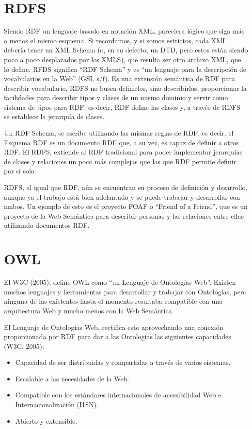 \section{RDFS}

Siendo RDF un lenguaje basado en notación XML, pareciera lógico que siga más o menos el mismo esquema. Si recordamos, y si somos estrictos, cada XML debería tener un XML Schema (o, en su defecto, un DTD, pero estos están siendo poco a poco desplazados por los XMLS), que resulta ser otro archivo XML, que lo define. RFDS significa ``RDF Schema'' y es ``un lenguaje para la descripción de vocabularios en la Web'' (GSI, s/f). Es una extensión semántica de RDF para describir vocabulario, RDFS no busca definirlos, sino describirlos, proporcionar la facilidades para describir tipos y clases de un mismo dominio y servir como sistema de tipos para RDF, es decir, RDF define las clases y, a través de RDFS se establece la jerarquía de clases.

Un RDF Schema, se escribe utilizando las mismas reglas de RDF, es decir, el Esquema RDF es un documento RDF que, a su vez, es capaz de definir a otros RDF. El RDFS, extiende al RDF tradicional para poder implementar jerarquías de clases y relaciones un poco más complejas que las que RDF permite definir por sí solo.

RDFS, al igual que RDF, aún se encuentran en proceso de definición y desarrollo, aunque ya el trabajo está bien adelantado y se puede trabajar y desarrollar con ambos. Un ejemplo de esto es el proyecto FOAF o ``Friend of a Friend'', que es un proyecto de la Web Semántica para describir personas y las relaciones entre ellas utilizando documentos RDF.

\section{OWL}

El W3C (2005), define OWL como ``un Lenguaje de Ontologías Web''. Existen muchos lenguajes y herramientas para desarrollar y trabajar con Ontologías, pero ninguna de las existentes hasta el momento resultaba compatible con una arquitectura Web y mucho menos con la Web Semántica. 

El Lenguaje de Ontologías Web, rectifica esto aprovechando una conexión proporcionada por RDF para dar a las Ontologías las siguientes capacidades (W3C, 2005):

\begin{itemize}
\item Capacidad de ser distribuidas y compartidas a través de varios sistemas.
\item Escalable a las necesidades de la Web.
\item Compatible con los estándares internacionales de accesibilidad Web e Internacionalización (I18N).
\item Abierto y extensible.
\end{itemize}

